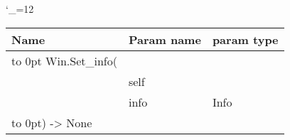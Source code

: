 \begingroup \catcode`\_=12 \tt
\begin{tabular}{lll}
\toprule
\textrm{Name}&\textrm{Param name}&\textrm{param type}\\
\midrule
\hbox to 0pt {Win.Set_info(\hss}\\
& self\\
& info & Info\\
\hbox to 0pt{) -> None\hss}\\
\bottomrule
\end{tabular}
\endgroup
